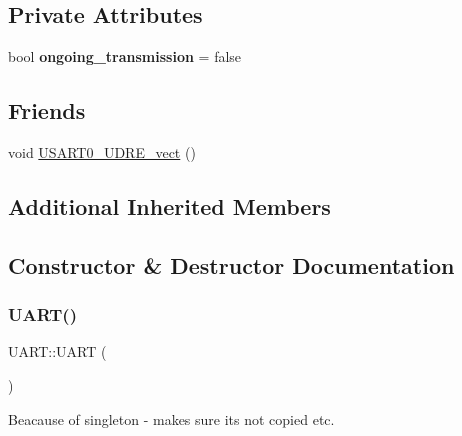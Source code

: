 \subsection*{Private Attributes}
\begin{DoxyCompactItemize}
\item 
\hypertarget{class_u_a_r_t_ae98e7d277a1833478aa85dc9e686150a}{}\label{class_u_a_r_t_ae98e7d277a1833478aa85dc9e686150a} 
bool {\bfseries ongoing\+\_\+transmission} = false
\end{DoxyCompactItemize}
\subsection*{Friends}
\begin{DoxyCompactItemize}
\item 
void \hyperlink{class_u_a_r_t_accc13d37cd82c841e387e1d5cf4d9a94}{U\+S\+A\+R\+T0\+\_\+\+U\+D\+R\+E\+\_\+vect} ()
\end{DoxyCompactItemize}
\subsection*{Additional Inherited Members}


\subsection{Constructor \& Destructor Documentation}
\hypertarget{class_u_a_r_t_a97debffc29b178c09b104f4542298a36}{}\label{class_u_a_r_t_a97debffc29b178c09b104f4542298a36} 
\subsubsection{\texorpdfstring{U\+A\+R\+T()}{UART()}\hspace{0.1cm}{\footnotesize\ttfamily [1/2]}}
{\footnotesize\ttfamily U\+A\+R\+T\+::\+U\+A\+RT (\begin{DoxyParamCaption}\item[{const \hyperlink{class_u_a_r_t}{U\+A\+RT} \&}]{ }\end{DoxyParamCaption})\hspace{0.3cm}{\ttfamily [delete]}}

Beacause of singleton -\/ makes sure its not copied etc. \hypertarget{class_u_a_r_t_a68e7e88d2a13f5da85f0fde1ef98515f}{}\label{class_u_a_r_t_a68e7e88d2a13f5da85f0fde1ef98515f} 
